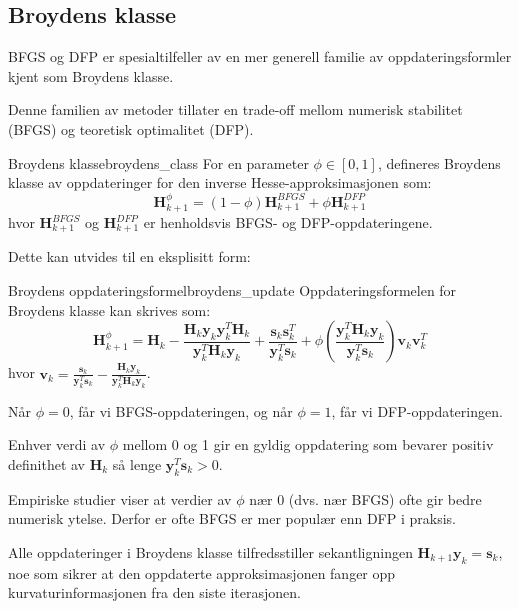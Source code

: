 \subsection{Broydens klasse}
BFGS og DFP er spesialtilfeller av en mer generell familie av oppdateringsformler kjent som Broydens klasse.

Denne familien av metoder tillater en trade-off mellom numerisk stabilitet (BFGS) og teoretisk optimalitet (DFP).

\begin{definition}{Broydens klasse}{broydens_class}
	For en parameter $\phi \in [0,1]$, defineres Broydens klasse av oppdateringer for den inverse Hesse-approksimasjonen som:
	\[
		\symbf{H}_{k+1}^\phi = (1-\phi)\symbf{H}_{k+1}^{BFGS} + \phi\symbf{H}_{k+1}^{DFP}
	\]
	hvor $\symbf{H}_{k+1}^{BFGS}$ og $\symbf{H}_{k+1}^{DFP}$ er henholdsvis BFGS- og DFP-oppdateringene.
\end{definition}

Dette kan utvides til en eksplisitt form:

\begin{proposition}{Broydens oppdateringsformel}{broydens_update}
	Oppdateringsformelen for Broydens klasse kan skrives som:
	\[
		\symbf{H}_{k+1}^\phi = \symbf{H}_k - \frac{\symbf{H}_k\symbf{y}_k\symbf{y}_k^T\symbf{H}_k}{\symbf{y}_k^T\symbf{H}_k\symbf{y}_k} + \frac{\symbf{s}_k\symbf{s}_k^T}{\symbf{y}_k^T\symbf{s}_k} + \phi\left(\frac{\symbf{y}_k^T\symbf{H}_k\symbf{y}_k}{\symbf{y}_k^T\symbf{s}_k}\right)\symbf{v}_k\symbf{v}_k^T
	\]
	hvor $\symbf{v}_k = \frac{\symbf{s}_k}{\symbf{y}_k^T\symbf{s}_k} - \frac{\symbf{H}_k\symbf{y}_k}{\symbf{y}_k^T\symbf{H}_k\symbf{y}_k}$.

	Når $\phi = 0$, får vi BFGS-oppdateringen, og når $\phi = 1$, får vi DFP-oppdateringen.

	Enhver verdi av $\phi$ mellom 0 og 1 gir en gyldig oppdatering som bevarer positiv definithet av $\symbf{H}_k$ så lenge $\symbf{y}_k^T\symbf{s}_k > 0$.
\end{proposition}

\begin{remark}{}{}
	Empiriske studier viser at verdier av $\phi$ nær 0 (dvs. nær BFGS) ofte gir bedre numerisk ytelse\cite{NocedalWright2006}.
	Derfor er ofte BFGS er mer populær enn DFP i praksis.
\end{remark}

Alle oppdateringer i Broydens klasse tilfredsstiller sekantligningen $\symbf{H}_{k+1}\symbf{y}_k = \symbf{s}_k$, noe som sikrer at den oppdaterte approksimasjonen fanger opp kurvaturinformasjonen fra den siste iterasjonen.

